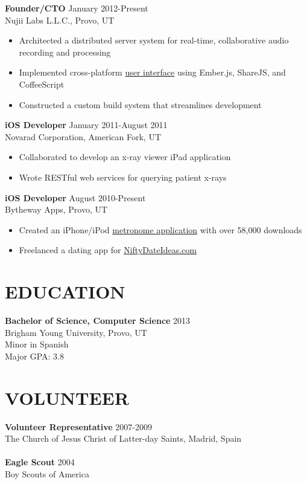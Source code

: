 \documentclass[margin]{res}
\begin{document}
\begin{resume}
      {\bf Founder/CTO} \hfill January 2012-Present \\
      Nujii Labs L.L.C., Provo, UT 
      \begin{itemize} \itemsep -2pt
        \item Architected a distributed server system for real-time,
        collaborative audio recording and processing
        \item Implemented cross-platform 
        \href{https://github.com/nujii/nujiistudio.js}{user interface}
        using Ember.js, ShareJS, and CoffeeScript
        \item Constructed a custom build system that streamlines development
      \end{itemize}

      {\bf iOS Developer} \hfill January 2011-August 2011 \\
      Novarad Corporation, American Fork, UT
      \begin{itemize} \itemsep -2pt
        \item Collaborated to develop an x-ray viewer iPad application
        \item Wrote RESTful web services for querying patient x-rays
      \end{itemize}

      {\bf iOS Developer} \hfill  August 2010-Present \\
      Bytheway Apps, Provo, UT
      \begin{itemize} \itemsep -2pt
        \item Created an iPhone/iPod
        \href{http://itunes.apple.com/us/app/backbeat-pro-metronome/id415229485?mt=8}{metronome application}
        with over 58,000 downloads
        \item Freelanced a dating app for
        \href{http://itunes.apple.com/us/app/nifty-date-ideas/id425978808?mt=8}{NiftyDateIdeas.com}
      \end{itemize}

    \section{EDUCATION}
      {\bf Bachelor of Science, Computer Science} \hfill 2013 \\
      Brigham Young University, Provo, UT\\
      Minor in Spanish\\
      Major GPA: 3.8

    \section{VOLUNTEER}
      {\bf Volunteer Representative} \hfill 2007-2009 \\
      The Church of Jesus Christ of Latter-day Saints, Madrid, Spain \\ \\
      {\bf Eagle Scout} \hfill 2004 \\
      Boy Scouts of America


\end{resume}
\end{document}
